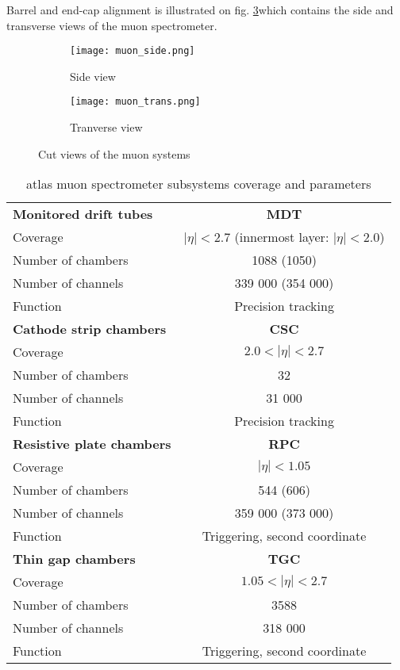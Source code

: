 	 Barrel and end-cap alignment is illustrated on fig. \ref{fig::muon_cut}which contains the side and transverse views of the muon spectrometer.
	\begin{figure}[htbp]
		\begin{subfigure}[t]{0.65\textwidth}
			\texttt{[image: muon\_side.png]}
			\caption[Side view]{Side view}
			\label{fig::id}
		\end{subfigure}
		\hfill
		\begin{subfigure}[t]{0.33\textwidth} 
			\texttt{[image: muon\_trans.png]}
			\caption[Tranverse view]{Tranverse view}
			\label{fig::pd}
		\end{subfigure}
		\caption{Cut views of the muon systems}
		\label{fig::muon_cut}
	\end{figure}
	
	\begin{table}
	\centering
	\begin{tabular}{|l|c|}
		\hline	
		\textbf{Monitored drift tubes} & \textbf{MDT} \\
		Coverage & $|\eta| < 2.7$ (innermost layer: $|\eta| < 2.0$) \\
		Number of chambers  & 1088 (1050)\\
		Number of channels  & 339 000 (354 000)\\
		Function  & Precision tracking\\
		\hline	
		\textbf{Cathode strip chambers} & \textbf{CSC} \\
		Coverage & $2.0 < |\eta| < 2.7$  \\
		Number of chambers  & 32\\
		Number of channels  & 31 000\\
		Function  & Precision tracking\\
		\hline	
		\textbf{Resistive plate chambers} & \textbf{RPC} \\
		Coverage & $|\eta| < 1.05$  \\
		Number of chambers  & 544 (606)\\
		Number of channels  & 359 000 (373 000)\\
		Function  & Triggering, second coordinate\\
		\hline	
		\textbf{Thin gap chambers} & \textbf{TGC} \\
		Coverage & $1.05 < |\eta| < 2.7$  \\
		Number of chambers  & 3588\\
		Number of channels  & 318 000\\
		Function  & Triggering, second coordinate\\
		\hline	
	\end{tabular}\\
	\caption{ \gls{atlas} muon spectrometer subsystems coverage and parameters}
	\label{tab::muon_table}
\end{table}

